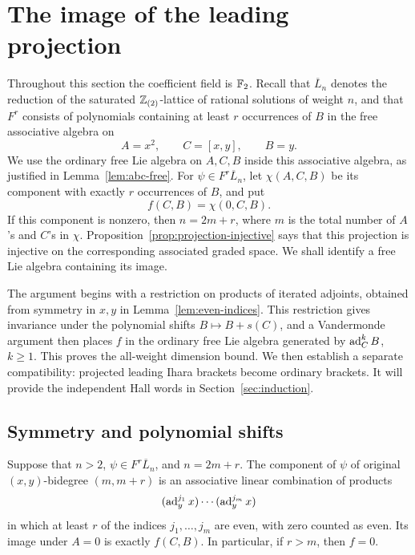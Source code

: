 \section{The image of the leading projection}
\label{sec:image}

Throughout this section the coefficient field is ${\mathbb F_2}$.
Recall that $\overline L_n$ denotes the reduction of the saturated
$\mathbb Z_{(2)}$-lattice of rational solutions of weight $n$, and that
$F^r$ consists of polynomials containing at least $r$ occurrences of $B$
in the free associative algebra on
\[
 A=x^2,\qquad C=[x,y],\qquad B=y.
\]
We use the ordinary free Lie algebra on $A,C,B$ inside this associative
algebra, as justified in Lemma~\ref{lem:abc-free}.
For $\psi\in F^r\overline L_n$, let $\chi(A,C,B)$ be its component
with exactly $r$ occurrences of $B$, and put
\[
 f(C,B)=\chi(0,C,B).
\]
If this component is nonzero, then $n=2m+r$, where $m$ is the total
number of $A$'s and $C$'s in $\chi$.
Proposition~\ref{prop:projection-injective} says that this projection
is injective on the corresponding associated graded space.
We shall identify a free Lie algebra containing its image.

The argument begins with a restriction on products of iterated adjoints,
obtained from symmetry in $x,y$ in Lemma~\ref{lem:even-indices}.
This restriction gives invariance under the polynomial shifts
$B\mapsto B+s(C)$, and a Vandermonde argument then places $f$ in the
ordinary free Lie algebra generated by $\operatorname{ad}_C^kB$, $k\geq1$.
This proves the all-weight dimension bound.  We then establish a
separate compatibility: projected leading Ihara brackets become
ordinary brackets.  It will provide the independent Hall words in
Section~\ref{sec:induction}.

\subsection{Symmetry and polynomial shifts}

\begin{lemma}
\label{lem:even-indices}
Suppose that $n>2$, $\psi\in F^r\overline L_n$, and $n=2m+r$.
The component of $\psi$ of original $(x,y)$-bidegree $(m,m+r)$
is an associative linear combination of products
\begin{equation}
 \label{eq:swapped-products}
 (\operatorname{ad}_y^{j_1}x)\cdots(\operatorname{ad}_y^{j_m}x)
\end{equation}
in which at least $r$ of the indices $j_1,\ldots,j_m$ are even,
with zero counted as even.
Its image under $A=0$ is exactly $f(C,B)$.
In particular, if $r>m$, then $f=0$.
\end{lemma}

